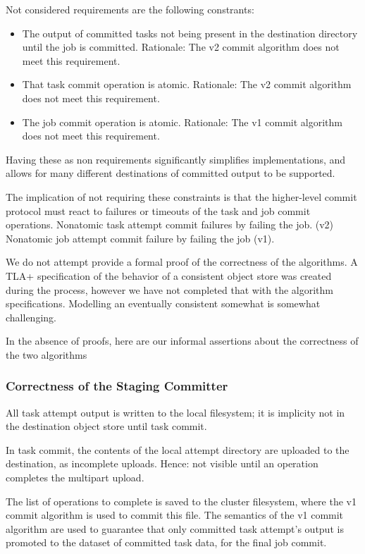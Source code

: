 \documentclass[conference]{IEEEtran}
\begin{document}
Not considered requirements are the following constrants:

\begin{itemize}
  \item The output of committed tasks not being present in the destination directory
  until the job is committed.
  Rationale: The v2 commit algorithm does not meet this requirement.

  \item That task commit operation is atomic.
  Rationale: The v2 commit algorithm does not meet this requirement.

  \item The job commit operation is atomic.
  Rationale: The v1 commit algorithm does not meet this requirement.

\end{itemize}

Having these as non requirements significantly simplifies implementations,
and allows for many different destinations of committed output to be supported.

The implication of not requiring these constraints is that the higher-level
commit protocol must react to failures or timeouts of the task and job
commit operations.
Nonatomic task attempt commit failures by failing the job. (v2)
Nonatomic job attempt commit failure by failing the job (v1).


We do not attempt provide a formal proof of the correctness of the algorithms.
A TLA+ specification of the behavior of a consistent object store was created
during the process, however we have not completed that with the algorithm specifications.
Modelling an eventually consistent somewhat is somewhat challenging.

In the absence of proofs,
here are our informal assertions about the correctness of the two algorithms

\subsubsection{Correctness of the Staging Committer}

All task attempt output is written to the local filesystem;
it is implicity not in the destination object store until task commit.

In task commit, the contents of the local attempt directory are uploaded to the
destination, as incomplete uploads.
Hence: not visible until an operation completes the multipart upload.

The list of operations to complete is saved to the cluster filesystem, where
the v1 commit algorithm is used to commit this file.
The semantics of the v1 commit algorithm are used to guarantee that only
committed task attempt's output is promoted to the dataset of committed task
data, for the final job commit.
\end{document}
